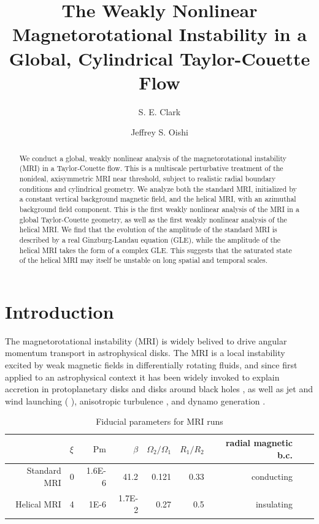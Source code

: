 \documentclass{emulateapj}
\newcommand{\citei}[1]{\citeauthor{#1} \citeyear{#1}}
\newcommand{\Pm}{\mathrm{Pm}}
\begin{document}
\title{The Weakly Nonlinear Magnetorotational Instability in a Global, Cylindrical Taylor-Couette Flow} 
\author{S. E. Clark}
\author{Jeffrey S. Oishi}

\begin{abstract}
We conduct a global, weakly nonlinear analysis of the magnetorotational instability (MRI) in a Taylor-Couette flow. This is a multiscale perturbative treatment of the nonideal, axisymmetric MRI near threshold, subject to realistic radial boundary conditions and cylindrical geometry. We analyze both the standard MRI, initialized by a constant vertical background magnetic field, and the helical MRI, with an azimuthal background field component. This is the first weakly nonlinear analysis of the MRI in a global Taylor-Couette geometry, as well as the first weakly nonlinear analysis of the helical MRI. We find that the evolution of the amplitude of the standard MRI is described by a real Ginzburg-Landau equation (GLE), while the amplitude of the helical MRI takes the form of a complex GLE. This suggests that the saturated state of the helical MRI may itself be unstable on long spatial and temporal scales.  
\end{abstract}

\section{Introduction}

The magnetorotational instability (MRI) is widely belived to drive angular momentum transport in astrophysical disks. The MRI is a local instability excited by weak magnetic fields in differentially rotating fluids, and since first applied to an astrophysical context \citep{Balbus:1991vs} it has been widely invoked to explain accretion in protoplanetary disks \citep{Armitage:2010} and disks around black holes \citep{Blaes:2014}, as well as jet and wind launching (\citei{Lesur:2013}), anisotropic turbulence \citep{Murphy:2015tn}, and dynamo generation \citep{Brandenburg:1995, Vishniac:2009il}. 

\begin{table}[ht]
\normalsize
\caption{Fiducial parameters for MRI runs} \label{table:parameters}
\centering
\begin{tabular}{rlrrrrrrr}
  \hline
 & $\xi$ & $\Pm$ & $\beta$ & $\Omega_2/\Omega_1$ & $R_1/R_2$ & radial magnetic b.c. \\ 
  \hline\hline
Standard MRI & 0 & 1.6E-6 & 41.2 & 0.121 & 0.33 & conducting \\ 
Helical MRI & 4 & 1E-6 & 1.7E-2 & 0.27 & 0.5 & insulating\\ 
   \hline
\end{tabular}
\end{table} 
\end{document}
